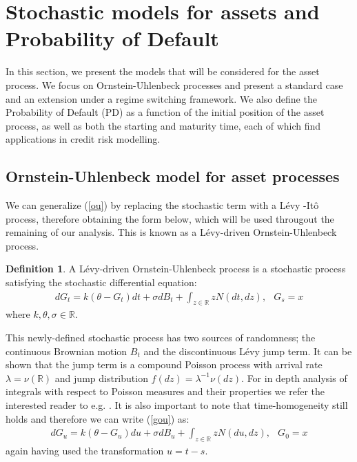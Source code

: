 \documentclass[11pt,reqno]{article}
\theoremstyle{definition}
\newtheorem{definition}[theorem]{Definition}
\begin{document}
\section{Stochastic models for assets and Probability of Default}
\par In this section, we present the models that will be considered for the asset process. We focus on Ornstein-Uhlenbeck processes and present a standard case and an extension under a regime switching framework. We also define the Probability of Default (PD) as a function of the initial position of the asset process, as well as both the starting and maturity time, each of which find applications in credit risk modelling. 
\subsection{Ornstein-Uhlenbeck model for asset processes}
We can generalize (\ref{ou}) by replacing the stochastic term with a L\'evy -It\^o process, therefore obtaining the form below, which will be used througout the remaining of our analysis. This is known as a L\'evy-driven Ornstein-Uhlenbeck process. 
\begin{definition} A L\'evy-driven Ornstein-Uhlenbeck process is a stochastic process satisfying the stochastic differential equation:
	\begin{eqnarray}\label{gou}
		dG_t=k(\theta - G_t)dt + \sigma dB_t +  \int_{z\in \mathbb{R}} z N(dt,dz), \,\,\,\ G_s = x
	\end{eqnarray}
	where $k, \theta, \sigma \in \mathbb{R}$.
\end{definition}
This newly-defined stochastic process has two sources of randomness; the continuous Brownian motion $B_t$ and the discontinuous L\'evy jump term. It can be shown that the jump term is a compound Poisson process with arrival rate $\lambda=\nu(\mathbb{R})$ and jump distribution $f(dz)=\lambda^{-1} \nu(dz)$. For in depth analysis of integrals with respect to Poisson measures and their properties we refer the interested reader to e.g. \cite{kyprianou2006introductory}. It is also important to note that time-homogeneity still holds and therefore we can write (\ref{gou}) as: 
\begin{eqnarray} 
	\label{gou1}
	dG_u=k(\theta - G_u)du + \sigma dB_u +  \int_{z\in \mathbb{R}} z N(du,dz), \,\,\,\ G_0 = x
\end{eqnarray}
again having used the transformation $u = t-s$. 
\end{document}
